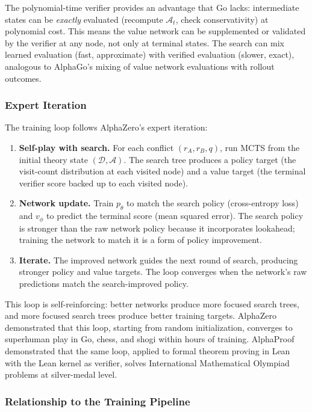 \documentclass[11pt]{article}
\newcommand{\D}{\mathcal{D}}
\begin{document}
The polynomial-time verifier provides an advantage that Go lacks: intermediate states can be \emph{exactly} evaluated (recompute $\mathcal{A}_t$, check conservativity) at polynomial cost. This means the value network can be supplemented or validated by the verifier at any node, not only at terminal states. The search can mix learned evaluation (fast, approximate) with verified evaluation (slower, exact), analogous to AlphaGo's mixing of value network evaluations with rollout outcomes.

\subsubsection{Expert Iteration}

The training loop follows AlphaZero's expert iteration:
\begin{enumerate}[nosep]
    \item \textbf{Self-play with search.} For each conflict $(r_A, r_B, q)$, run MCTS from the initial theory state $(\D, \mathcal{A})$. The search tree produces a policy target (the visit-count distribution at each visited node) and a value target (the terminal verifier score backed up to each visited node).
    \item \textbf{Network update.} Train $p_\theta$ to match the search policy (cross-entropy loss) and $v_\phi$ to predict the terminal score (mean squared error). The search policy is stronger than the raw network policy because it incorporates lookahead; training the network to match it is a form of policy improvement.
    \item \textbf{Iterate.} The improved network guides the next round of search, producing stronger policy and value targets. The loop converges when the network's raw predictions match the search-improved policy.
\end{enumerate}

This loop is self-reinforcing: better networks produce more focused search trees, and more focused search trees produce better training targets. AlphaZero demonstrated that this loop, starting from random initialization, converges to superhuman play in Go, chess, and shogi within hours of training. AlphaProof~\cite{alphaproof2025} demonstrated that the same loop, applied to formal theorem proving in Lean with the Lean kernel as verifier, solves International Mathematical Olympiad problems at silver-medal level.

\subsubsection{Relationship to the Training Pipeline}
\end{document}
